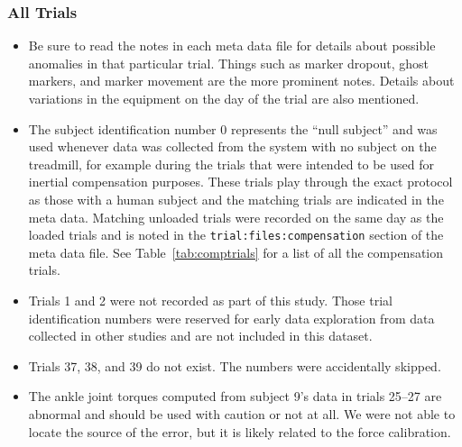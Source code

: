 \documentclass[fleqn,12pt]{wlpeerj}
\begin{document}
\subsubsection*{All Trials}
%
\begin{itemize}
  \item Be sure to read the notes in each meta data file for details about
    possible anomalies in that particular trial. Things such as marker dropout,
    ghost markers, and marker movement are the more prominent notes. Details
    about variations in the equipment on the day of the trial are also
    mentioned.
  \item The subject identification number 0 represents the ``null subject'' and
    was used whenever data was collected from the system with no subject on the
    treadmill, for example during the trials that were intended to be used for
    inertial compensation purposes. These trials play through the exact
    protocol as those with a human subject and the matching trials are
    indicated in the meta data. Matching unloaded trials were recorded on the
    same day as the loaded trials and is noted in the
    \verb|trial:files:compensation| section of the meta data file. See
    Table~\ref{tab:comptrials} for a list of all the compensation trials.
  \item Trials 1 and 2 were not recorded as part of this study. Those trial
    identification numbers were reserved for early data exploration from data
    collected in other studies and are not included in this dataset.
  \item Trials 37, 38, and 39 do not exist. The numbers were accidentally
    skipped.
  \item The ankle joint torques computed from subject 9's data in trials 25--27
    are abnormal and should be used with caution or not at all. We were not
    able to locate the source of the error, but it is likely related to the
    force calibration.
\end{itemize}
\end{document}
